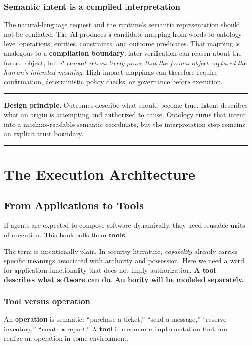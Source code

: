 \documentclass[10pt,oneside,openany]{book}
\newcommand{\term}[1]{\textbf{#1}}
\newcommand{\principle}[1]{%
  \vspace{4pt}
  \noindent\begin{minipage}{\linewidth}
  \hrule\vspace{5pt}
  \small\sffamily\raggedright\textbf{Design principle.} #1
  \vspace{5pt}\hrule
  \end{minipage}\vspace{4pt}
}
\begin{document}
\section{Semantic intent is a compiled interpretation}
The natural-language request and the runtime's semantic representation should not be conflated. The AI produces a candidate mapping from words to ontology-level operations, entities, constraints, and outcome predicates. That mapping is analogous to a \term{compilation boundary}: later verification can reason about the formal object, but \emph{it cannot retroactively prove that the formal object captured the human's intended meaning}. High-impact mappings can therefore require confirmation, deterministic policy checks, or governance before execution.

\principle{Outcomes describe what should become true. Intent describes what an origin is attempting and authorized to cause. Ontology turns that intent into a machine-readable semantic coordinate, but the interpretation step remains an explicit trust boundary.}


\part{The Execution Architecture}

\chapter{From Applications to Tools}

If agents are expected to compose software dynamically, they need reusable units of execution. This book calls them \term{tools}.

The term is intentionally plain. In security literature, \emph{capability} already carries specific meanings associated with authority and possession. Here we need a word for application functionality that does not imply authorization. \textbf{A tool describes what software can do. Authority will be modeled separately.}

\section{Tool versus operation}
An \term{operation} is semantic: ``purchase a ticket,'' ``send a message,'' ``reserve inventory,'' ``create a report.'' A \term{tool} is a concrete implementation that can realize an operation in some environment.
\end{document}
